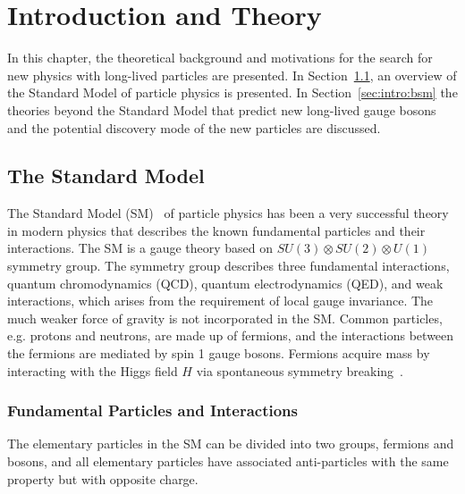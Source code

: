 \chapter{Introduction and Theory}
\label{chap:introduction}

In this chapter, the theoretical background and motivations for the search for new physics with long-lived particles are presented. In Section~\ref{sec:intro:standard_model}, an overview of the Standard Model of particle physics is presented. In Section~\ref{sec:intro:bsm} the theories beyond the Standard Model that predict new long-lived gauge bosons and the potential discovery mode of the new particles are discussed.



\section{The Standard Model}
\label{sec:intro:standard_model}

The Standard Model (SM)~\cite{Burgess:1003111} of particle physics has been a very successful theory in modern physics that describes the known fundamental particles and their interactions. The SM is a gauge theory based on $SU(3) \otimes SU(2) \otimes U(1)$ symmetry group. The symmetry group describes three fundamental interactions, quantum chromodynamics (QCD), quantum electrodynamics (QED), and weak interactions, which arises from the requirement of local gauge invariance. The much weaker force of gravity is not incorporated in the SM. Common particles, e.g. protons and neutrons, are made up of fermions, and the interactions between the fermions are mediated by spin 1 gauge bosons. Fermions acquire mass by interacting with the Higgs field $H$ via spontaneous symmetry breaking~\cite{Higgs:429539}.

\subsection{Fundamental Particles and Interactions}
\label{sec:intro:fundamental_particles}
The elementary particles in the SM can be divided into two groups, fermions and bosons, and all elementary particles have associated anti-particles with the same property but with opposite charge.

